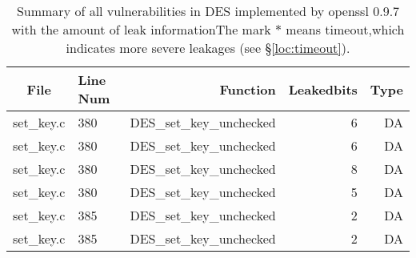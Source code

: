 \begin{table*}%
\centering
\caption{Summary of all vulnerabilities in DES implemented by openssl 0.9.7 with the amount of leak informationThe mark $*$ means timeout,which indicates more severe leakages (see \S\ref{loc:timeout}).}\label{tab:DESopenssl}
\begin{tabular}{clrrr}
\hline
\textbf{File} & \textbf{Line Num} & \textbf{Function} & \textbf{Leakedbits} & \textbf{Type} \\\hline
set\_key.c&380&DES\_set\_key\_unchecked&6 &DA\\
set\_key.c&380&DES\_set\_key\_unchecked&6 &DA\\
set\_key.c&380&DES\_set\_key\_unchecked&8 &DA\\
set\_key.c&380&DES\_set\_key\_unchecked&5 &DA\\
set\_key.c&385&DES\_set\_key\_unchecked&2 &DA\\
set\_key.c&385&DES\_set\_key\_unchecked&2 &DA\\
\hline
\end{tabular}
\end{table*}